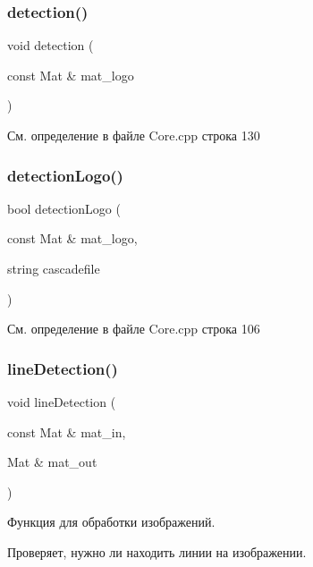 \subsubsection{\texorpdfstring{detection()}{detection()}}
{\footnotesize\ttfamily void detection (\begin{DoxyParamCaption}\item[{const Mat \&}]{mat\+\_\+logo }\end{DoxyParamCaption})}



См. определение в файле Core.\+cpp строка 130

\mbox{\label{group__corecpp_ga76b0b7de3d9fa0de10d66740466ebc14}} 
\subsubsection{\texorpdfstring{detection\+Logo()}{detectionLogo()}}
{\footnotesize\ttfamily bool detection\+Logo (\begin{DoxyParamCaption}\item[{const Mat \&}]{mat\+\_\+logo,  }\item[{string}]{cascadefile }\end{DoxyParamCaption})}



См. определение в файле Core.\+cpp строка 106

\mbox{\label{group__corecpp_ga9e277d82296b5ed9eda6266d8dcc24a3}} 
\subsubsection{\texorpdfstring{line\+Detection()}{lineDetection()}}
{\footnotesize\ttfamily void line\+Detection (\begin{DoxyParamCaption}\item[{const Mat \&}]{mat\+\_\+in,  }\item[{Mat \&}]{mat\+\_\+out }\end{DoxyParamCaption})}



Функция для обработки изображений. 

Проверяет, нужно ли находить линии на изображении.

